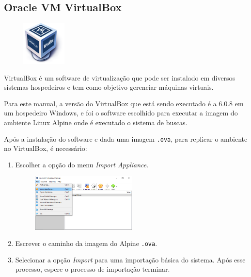 \subsection{Oracle VM VirtualBox}\label{vbox}

\begin{figure} %
    \centering
    \includegraphics[width=0.2\textwidth]{../images/vbox.png}
\end{figure}

VirtualBox é um software de virtualização que pode ser instalado em diversos sistemas hospedeiros e tem como objetivo gerenciar máquinas virtuais.

Para este manual, a versão do VirtualBox que está sendo executado é a 6.0.8 em um hospedeiro Windows, e foi o software escolhido para executar a imagem do ambiente Linux Alpine onde é executado o sistema de buscas.

Após a instalação do software e dada uma imagem \lstinline{.ova}, para replicar o ambiente no VirtualBox, é necessário:
\begin{enumerate}
    \item Escolher a opção do menu \textit{Import Appliance}.
     \begin{figure}[H]
        \centering
        \includegraphics[width=0.5\textwidth]{images/vbox1.png}
    \end{figure}
    \item Escrever o caminho da imagem do Alpine \lstinline{.ova}.
    \item Selecionar a opção \textit{Import} para uma importação básica do sistema. Após esse processo, espere o processo de importação terminar.
\end{enumerate}

